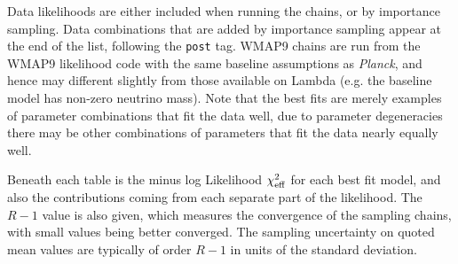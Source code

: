 Data likelihoods are either included when running the chains, or by importance sampling. Data combinations that are added by importance sampling appear
at the end of the list, following the {\tt post{\textunderscore}} tag. WMAP9 chains are run from the WMAP9 likelihood code with the same baseline assumptions as \textit{Planck}, and hence
may different slightly from those available on Lambda (e.g. the baseline model has non-zero neutrino mass). Note that the best fits are merely examples of parameter combinations that fit the data well, due to parameter degeneracies there may be other combinations of parameters that fit the data nearly equally well.

Beneath each table is the minus log Likelihood $\chi^2_{\rm eff}$ for each best fit model, and also the contributions coming from each separate part of the likelihood. The $R-1$ value is also given, which measures the convergence of the sampling chains, with small values being better converged. The sampling uncertainty on quoted mean values are typically of order $R-1$ in units of the standard deviation.


\newpage

